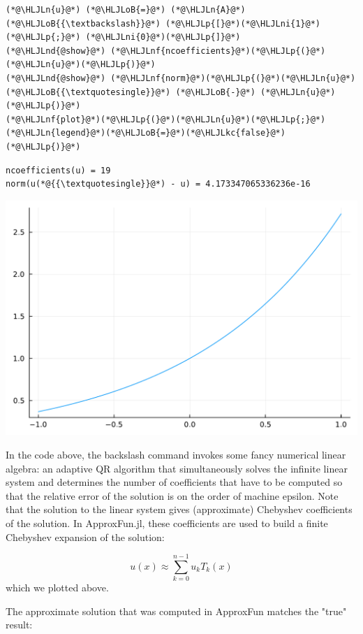 \documentclass[12pt,a4paper]{article}
\newcommand{\HLJLkc}[1]{\textcolor[RGB]{59,151,46}{\textit{#1}}}
\newcommand{\HLJLn}[1]{#1}
\newcommand{\HLJLnd}[1]{\textcolor[RGB]{214,102,97}{#1}}
\newcommand{\HLJLnf}[1]{\textcolor[RGB]{66,102,213}{#1}}
\newcommand{\HLJLni}[1]{\textcolor[RGB]{59,151,46}{#1}}
\newcommand{\HLJLoB}[1]{\textcolor[RGB]{102,102,102}{\textbf{#1}}}
\newcommand{\HLJLp}[1]{#1}
\begin{document}
\begin{lstlisting}
(*@\HLJLn{u}@*) (*@\HLJLoB{=}@*) (*@\HLJLn{A}@*) (*@\HLJLoB{{\textbackslash}}@*) (*@\HLJLp{[}@*)(*@\HLJLni{1}@*)(*@\HLJLp{;}@*) (*@\HLJLni{0}@*)(*@\HLJLp{]}@*)
(*@\HLJLnd{@show}@*) (*@\HLJLnf{ncoefficients}@*)(*@\HLJLp{(}@*)(*@\HLJLn{u}@*)(*@\HLJLp{)}@*)
(*@\HLJLnd{@show}@*) (*@\HLJLnf{norm}@*)(*@\HLJLp{(}@*)(*@\HLJLn{u}@*)(*@\HLJLoB{{\textquotesingle}}@*) (*@\HLJLoB{-}@*) (*@\HLJLn{u}@*)(*@\HLJLp{)}@*)
(*@\HLJLnf{plot}@*)(*@\HLJLp{(}@*)(*@\HLJLn{u}@*)(*@\HLJLp{;}@*)(*@\HLJLn{legend}@*)(*@\HLJLoB{=}@*)(*@\HLJLkc{false}@*)(*@\HLJLp{)}@*)
\end{lstlisting}

\begin{lstlisting}
ncoefficients(u) = 19
norm(u(*@{{\textquotesingle}}@*) - u) = 4.173347065336236e-16
\end{lstlisting}

\includegraphics[width=\linewidth]{jl_GsbqQZ/Chapter4_25_1.pdf}

In the code above, the backslash command invokes some fancy numerical linear algebra: an adaptive QR algorithm that simultaneously solves the infinite linear system and determines the number of coefficients that have to be computed so that the relative error of the solution is on the order of machine epsilon.  Note that the solution to the linear system gives (approximate) Chebyshev coefficients of the solution.  In ApproxFun.jl, these coefficients are used to build a finite Chebyshev expansion of the solution:

\[
u(x) \approx \sum_{k = 0}^{n-1}u_kT_k(x)
\]
which we plotted above.

The approximate solution that was computed in ApproxFun matches the "true" result:
\end{document}
